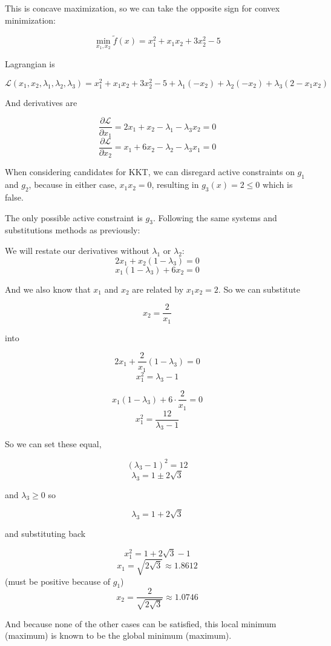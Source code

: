 \documentclass[11pt]{article}
\begin{document}
This is concave maximization, so we can take the opposite sign for
convex minimization:

\[\min_{x_1, x_2} \tilde{f}(x) = x_1^2 + x_1 x_2 + 3x_2^2 - 5\]

Lagrangian is

\[\mathcal{L}(x_1, x_2, \lambda_1, \lambda_2, \lambda_3) = x_1^2 + x_1 x_2 + 3x_2^2 - 5 + \lambda_1(-x_2) + \lambda_2(-x_2) + \lambda_3(2 - x_1 x_2)\]

And derivatives are

\[\frac{\partial \mathcal{L}}{\partial x_1} = 2x_1 + x_2 - \lambda_1 - \lambda_3 x_2 = 0\]
\[\frac{\partial \mathcal{L}}{\partial x_2} = x_1 + 6x_2 - \lambda_2 - \lambda_3 x_1 = 0\]

When considering candidates for KKT, we can disregard active constraints
on \(g_1\) and \(g_2\), because in either case, \(x_1x_2 = 0\),
resulting in \(g_3(x) = 2 \leq 0\) which is false.

The only possible active constraint is \(g_3\). Following the same
systems and substitutions methods as previously:

We will restate our derivatives without \(\lambda_1\) or \(\lambda_2\):
\[2x_1 + x_2(1 - \lambda_3) = 0\] \[x_1(1 - \lambda_3) + 6x_2 = 0\]

And we also know that \(x_1\) and \(x_2\) are related by \(x_1x_2 = 2\).
So we can substitute

\[x_2 = \frac{2}{x_1}\]

into

\[2x_1 + \frac{2}{x_1}(1 - \lambda_3) = 0\] \[x_1^2 = \lambda_3 - 1\]

\[x_1(1-\lambda_3) + 6 \cdot \frac{2}{x_1} = 0\]
\[x_1^2 = \frac{12}{\lambda_3 - 1}\]

So we can set these equal,

\[(\lambda_3 - 1)^2 = 12\] \[\lambda_3 = 1 \pm 2 \sqrt{3}\]

and \(\lambda_3 \geq 0\) so

\[\lambda_3 = 1 + 2\sqrt{3}\]

and substituting back

\[x_1^2 = 1 + 2 \sqrt{3} - 1\] \[x_1 = \sqrt{2\sqrt{3}} \approx 1.8612\]
(must be positive because of \(g_1\))
\[x_2 = \frac{2}{\sqrt{2\sqrt{3}}} \approx 1.0746\]

And because none of the other cases can be satisfied, this local minimum
(maximum) is known to be the global minimum (maximum).
\end{document}
